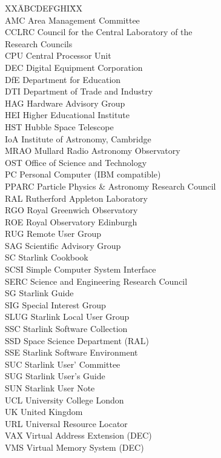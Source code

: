 \documentclass[twoside,11pt]{article}
\begin{document}
{\small
\begin{tabbing}
XX\=ABCDEFGHI\=XX\kill
\>  \>  \\
\>AMC   \>Area Management Committee  \\
\>CCLRC \>Council for the Central Laboratory of the\\
\>      \>Research Councils\\
\>CPU   \>Central Processor Unit \\
\>DEC   \>Digital Equipment Corporation\\
\>DfE   \>Department for Education \\
\>DTI   \>Department of Trade and Industry \\
\>HAG   \>Hardware Advisory Group\\
\>HEI   \>Higher Educational Institute  \\
\>HST   \>Hubble Space Telescope\\
\>IoA   \>Institute of Astronomy, Cambridge\\
\>MRAO  \>Mullard Radio Astronomy Observatory  \\
\>OST   \>Office of Science and Technology \\
\>PC    \>Personal Computer (IBM compatible)\\
\>PPARC \>Particle Physics \& Astronomy Research Council\\
\>RAL   \>Rutherford Appleton Laboratory\\
\>RGO   \>Royal Greenwich Observatory\\
\>ROE   \>Royal Observatory Edinburgh\\
\>RUG   \> Remote User Group \\
\>SAG   \>Scientific Advisory Group\\
\>SC    \>Starlink Cookbook\\
\>SCSI  \>Simple Computer System Interface\\
\>SERC  \>Science and Engineering Research Council\\
\>SG    \>Starlink Guide\\
\>SIG   \>Special Interest Group\\
\>SLUG  \>Starlink Local User Group\\
\>SSC   \>Starlink Software Collection\\
\>SSD   \>Space Science Department (RAL)\\
\>SSE   \>Starlink Software Environment \\
\>SUC   \>Starlink User' Committee \\
\>SUG   \>Starlink User's Guide\\
\>SUN   \>Starlink User Note\\
\>UCL   \>University College London\\
\>UK    \>United Kingdom \\
\>URL   \>Universal Resource Locator\\
\>VAX   \>Virtual Address Extension (DEC)\\
\>VMS   \>Virtual Memory System (DEC)\\
\end{tabbing}
}
\end{document}
